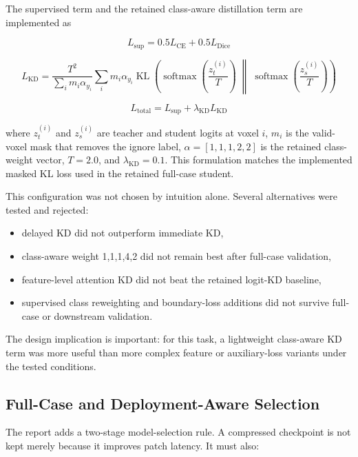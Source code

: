 The supervised term and the retained class-aware distillation term are
implemented as

\[
L_{\mathrm{sup}} = 0.5 L_{\mathrm{CE}} + 0.5 L_{\mathrm{Dice}}
\]

\[
L_{\mathrm{KD}} =
\frac{T^2}{\sum_i m_i \alpha_{y_i}}
\sum_i m_i \alpha_{y_i}
\operatorname{KL}
\left(
\operatorname{softmax}\left(\frac{z_t^{(i)}}{T}\right)
\;\middle\|\;
\operatorname{softmax}\left(\frac{z_s^{(i)}}{T}\right)
\right)
\]

\[
L_{\mathrm{total}} = L_{\mathrm{sup}} + \lambda_{\mathrm{KD}} L_{\mathrm{KD}}
\]

where \(z_t^{(i)}\) and \(z_s^{(i)}\) are teacher and student logits at
voxel \(i\), \(m_i\) is the valid-voxel mask that removes the ignore
label, \(\alpha = [1,1,1,2,2]\) is the retained class-weight vector,
\(T = 2.0\), and \(\lambda_{\mathrm{KD}} = 0.1\). This formulation
matches the implemented masked KL loss used in the retained full-case
student.

This configuration was not chosen by intuition alone. Several
alternatives were tested and rejected:

\begin{itemize}
\tightlist
\item
  delayed KD did not outperform immediate KD,
\item
  class-aware weight 1,1,1,4,2 did not remain best after
  full-case validation,
\item
  feature-level attention KD did not beat the retained logit-KD
  baseline,
\item
  supervised class reweighting and boundary-loss additions did not
  survive full-case or downstream validation.
\end{itemize}

The design implication is important: for this task, a lightweight
class-aware KD term was more useful than more complex feature or
auxiliary-loss variants under the tested conditions.

\hypertarget{full-case-and-deployment-aware-selection}{%
\subsection{Full-Case and Deployment-Aware
Selection}\label{full-case-and-deployment-aware-selection}}

The report adds a two-stage model-selection rule. A compressed
checkpoint is not kept merely because it improves patch latency. It must
also:

